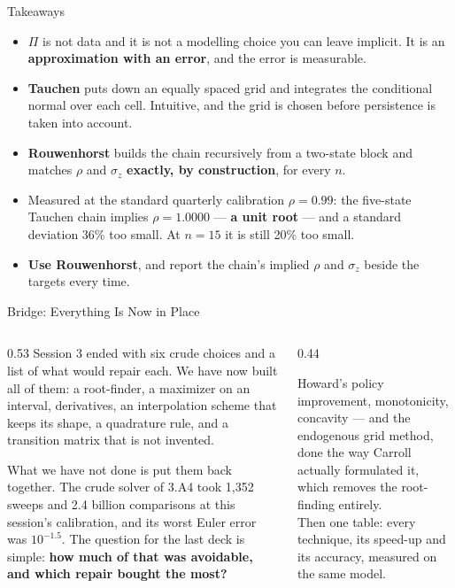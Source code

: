 \begin{frame}{Takeaways}
\begin{takeawaybox}
\begin{itemize}\small
  \item $\Pi$ is not data and it is not a modelling choice you can leave implicit. It is an \textbf{approximation with an error}, and the error is measurable.
  \item \textbf{Tauchen} puts down an equally spaced grid and integrates the conditional normal over each cell. Intuitive, and the grid is chosen before persistence is taken into account.
  \item \textbf{Rouwenhorst} builds the chain recursively from a two-state block and matches $\rho$ and $\sigma_z$ \textbf{exactly, by construction}, for every $n$.
  \item Measured at the standard quarterly calibration $\rho=0.99$: the five-state Tauchen chain implies $\rho=1.0000$ --- \textbf{a unit root} --- and a standard deviation 36\% too small. At $n=15$ it is still 20\% too small.
  \item \textbf{Use Rouwenhorst}, and report the chain's implied $\rho$ and $\sigma_z$ beside the targets every time.
\end{itemize}
\end{takeawaybox}
\end{frame}

\begin{frame}{Bridge: Everything Is Now in Place}
\begin{columns}[T]
\begin{column}{0.53\textwidth}
\small
Session 3 ended with six crude choices and a list of what would repair each. We have now built all of them: a root-finder, a maximizer on an interval, derivatives, an interpolation scheme that keeps its shape, a quadrature rule, and a transition matrix that is not invented.
\medskip

What we have not done is put them back together. The crude solver of 3.A4 took 1{,}352 sweeps and 2.4 billion comparisons at this session's calibration, and its worst Euler error was $10^{-1.5}$. The question for the last deck is simple: \textbf{how much of that was avoidable, and which repair bought the most?}
\end{column}
\begin{column}{0.44\textwidth}
\begin{conceptbox}[title=\textbf{Next (4.B4)}]\small
Howard's policy improvement, monotonicity, concavity --- and the endogenous grid method, done the way Carroll actually formulated it, which removes the root-finding entirely.\\[1mm]
Then one table: every technique, its speed-up and its accuracy, measured on the same model.
\end{conceptbox}
\end{column}
\end{columns}
\end{frame}


